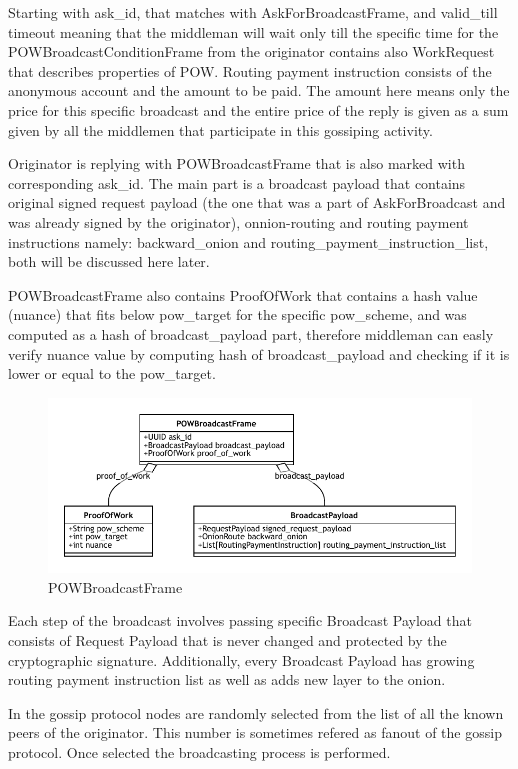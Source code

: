 \documentclass{article}
\begin{document}
Starting with ask\_id, that matches with AskForBroadcastFrame, and valid\_till timeout meaning that the middleman will wait only till the specific time for the POWBroadcastConditionFrame from the originator contains also WorkRequest that describes properties of POW. Routing payment instruction consists of the anonymous account and the amount to be paid. The amount here means only the price for this specific broadcast and the entire price of the reply is given as a sum given by all the middlemen that participate in this gossiping activity.

Originator is replying with POWBroadcastFrame that is also marked with corresponding ask\_id. The main part is a broadcast payload that contains original signed request payload (the one that was a part of AskForBroadcast and was already signed by the originator), onnion-routing and routing payment instructions namely: backward\_onion and routing\_payment\_instruction\_list, both will be discussed here later.

POWBroadcastFrame also contains ProofOfWork that contains a hash value (nuance) that fits below pow\_target for the specific pow\_scheme, and was computed as a hash of broadcast\_payload part, therefore middleman can easly verify nuance value by computing hash of broadcast\_payload and checking if it is lower or equal to the pow\_target.

\begin{figure}
	\centering
	\includegraphics[scale=1.0]{POWBroadcastFrame.pdf}
	\caption{POWBroadcastFrame}
	\label{fig:fr:powbroadcastframe}
\end{figure}


Each step of the broadcast involves passing specific Broadcast Payload that consists of Request Payload that is never changed and protected by the cryptographic signature.  Additionally, every Broadcast Payload has growing routing payment instruction list as well as adds new layer to the onion.

In the gossip protocol nodes are randomly selected from the list of all the known peers of the originator. This number is sometimes refered as fanout \cite{Fanout} of the gossip protocol. Once selected the broadcasting process is performed.
\end{document}
